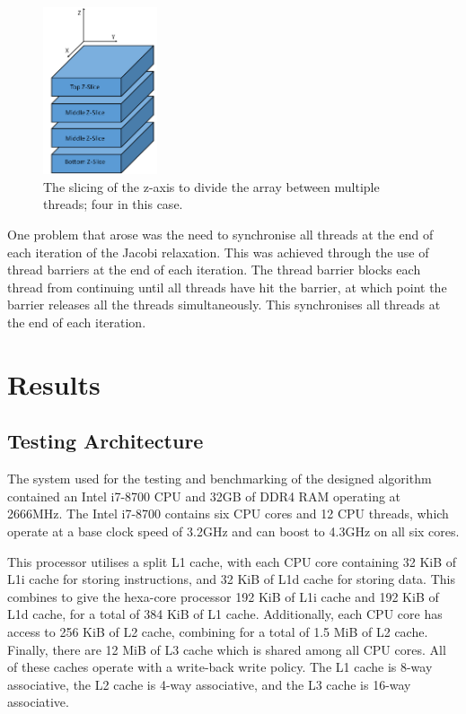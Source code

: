 \documentclass[12pt]{article}
\begin{document}
\begin{figure}[H]
    \begin{center}
        \includegraphics[width=0.3\textwidth]{fig/blocks.png}
        \caption{The slicing of the z-axis to divide the array between multiple threads; four in this case.}
        \label{fig:block-design}
    \end{center}
\end{figure}

One problem that arose was the need to synchronise all threads at the end of each iteration of the Jacobi relaxation.
This was achieved through the use of thread barriers at the end of each iteration. The thread barrier blocks each
thread from continuing until all threads have hit the barrier, at which point the barrier releases all the threads
simultaneously. This synchronises all threads at the end of each iteration.

\section{Results}

\subsection{Testing Architecture}
The system used for the testing and benchmarking of the designed algorithm contained an Intel i7-8700 CPU and
32GB of DDR4 RAM operating at 2666MHz. The Intel i7-8700 contains six CPU cores and 12 CPU threads, which operate
at a base clock speed of 3.2GHz and can boost to 4.3GHz on all six cores. 

This processor utilises a split L1 cache, with each CPU core containing 32 KiB of L1i cache for storing instructions,
and 32 KiB of L1d cache for storing data. This combines to give the hexa-core processor 192 KiB of L1i cache and
192 KiB of L1d cache, for a total of 384 KiB of L1 cache. Additionally, each CPU core has access to 256 KiB of L2
cache, combining for a total of 1.5 MiB of L2 cache. Finally, there are 12 MiB of L3 cache which is shared among
all CPU cores.  All of these caches operate with a write-back write policy. The L1 cache is 8-way associative, the
L2 cache is 4-way associative, and the L3 cache is 16-way associative.
\end{document}
